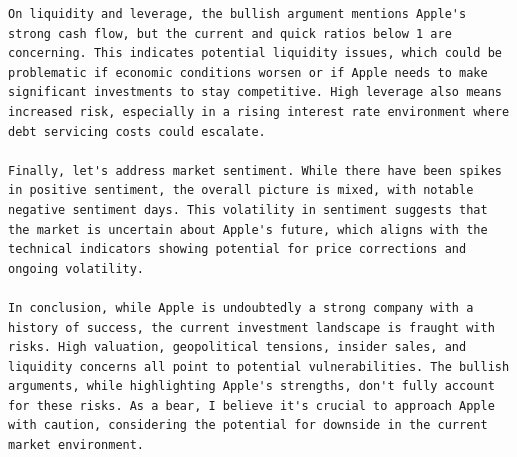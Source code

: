 \begin{tcolorbox}
\begin{lstlisting}[style=agentbase]
On liquidity and leverage, the bullish argument mentions Apple's strong cash flow, but the current and quick ratios below 1 are concerning. This indicates potential liquidity issues, which could be problematic if economic conditions worsen or if Apple needs to make significant investments to stay competitive. High leverage also means increased risk, especially in a rising interest rate environment where debt servicing costs could escalate.

Finally, let's address market sentiment. While there have been spikes in positive sentiment, the overall picture is mixed, with notable negative sentiment days. This volatility in sentiment suggests that the market is uncertain about Apple's future, which aligns with the technical indicators showing potential for price corrections and ongoing volatility.

In conclusion, while Apple is undoubtedly a strong company with a history of success, the current investment landscape is fraught with risks. High valuation, geopolitical tensions, insider sales, and liquidity concerns all point to potential vulnerabilities. The bullish arguments, while highlighting Apple's strengths, don't fully account for these risks. As a bear, I believe it's crucial to approach Apple with caution, considering the potential for downside in the current market environment.
\end{lstlisting}
\end{tcolorbox}

